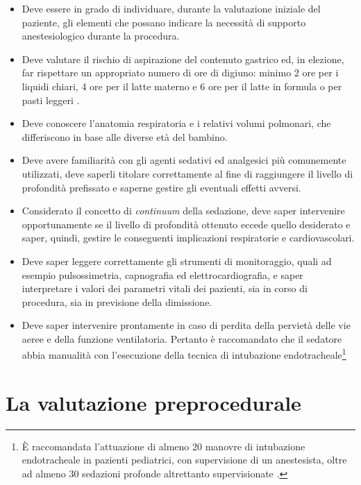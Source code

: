 \begin{itemize}
    \item Deve essere in grado di individuare, durante la valutazione iniziale del paziente, gli elementi che possano indicare la necessità di supporto anestesiologico durante la procedura.
    \item Deve valutare il rischio di aspirazione del contenuto gastrico ed, in elezione, far rispettare un appropriato numero di ore di digiuno: minimo 2 ore per i liquidi chiari, 4 ore per il latte materno e 6 ore per il latte in formula o per pasti leggeri \cite{Guidelines2019}. 
    \item Deve conoscere l'anatomia respiratoria e i relativi volumi polmonari, che differiscono in base alle diverse età del bambino. 
    \item Deve avere familiarità con gli agenti sedativi ed analgesici più comunemente utilizzati, deve saperli titolare correttamente al fine di raggiungere il livello di profondità prefissato e saperne gestire gli eventuali effetti avversi. 
    \item Considerato il concetto di \emph{continuum} della sedazione, deve saper intervenire opportunamente se il livello di profondità ottenuto eccede quello desiderato e saper, quindi, gestire le conseguenti implicazioni respiratorie e cardiovascolari. 
    \item Deve saper leggere correttamente gli strumenti di monitoraggio, quali ad esempio pulsossimetria, capnografia ed elettrocardiografia, e saper interpretare i valori dei parametri vitali dei pazienti, sia in corso di procedura, sia in previsione della dimissione. 
    \item Deve saper intervenire prontamente in caso di perdita della pervietà delle vie aeree e della funzione ventilatoria. Pertanto è raccomandato che il sedatore abbia manualità con l'esecuzione della tecnica di intubazione endotracheale\footnote{\`E raccomandata l'attuazione di almeno 20 manovre di intubazione endotracheale in pazienti pediatrici, con supervisione di un anestesista, oltre ad almeno 30 sedazioni profonde altrettanto supervisionate \cite{Simeupsedazione}.}
\end{itemize}

\section{La valutazione preprocedurale}

